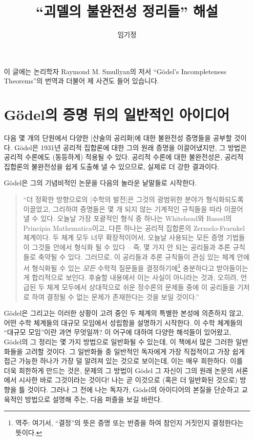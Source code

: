 \documentclass[12pt]{paper}
\title{``괴델의 불완전성 정리들'' 해설}
\author{임기정}
\begin{document}
  \maketitle

  이 글에는 논리학자 Raymond M. Smullyan의 저서 ``G\"odel's Incompleteness Theorems''의 번역과 더불어 제 사견도 들어 있습니다.

  \newpage

  \section{G\"odel의 증명 뒤의 일반적인 아이디어}
  \hspace{12pt}

  다음 몇 개의 단원에서 다양한 [산술의 공리화]에 대한 불완전성 증명들을 공부할 것이다.
  G\"odel은 1931년 공리적 집합론에 대한 그의 원래 증명을 이끌어냈지만,
  그 방법은 공리적 수론에도 (동등하게) 적용될 수 있다.
  공리적 수론에 대한 불완전성은,
  공리적 집합론의 불완전성을 쉽게 도출해 낼 수 있으므로,
  실제로 더 강한 결과이다.
  
  G\"odel은 그의 기념비적인 논문을 다음의 놀라운 낱말들로 시작한다.

  \begin{quotation}
    ``더 정확한 방향으로의 [수학의 발전]은 그것의 광범위한 분야가 형식화되도록 이끌었고,
    그리하여 증명들은 몇 개 되지 않는 기계적인 규칙들을 따라 이끌어 낼 수 있다.
    오늘날 가장 포괄적인 형식 중 하나는 Whitehead와 Russel의 Principia Mathematica이고,
    다른 하나는 공리적 집합론의 Zermelo-Fraenkel 체계이다.
    두 체계 모두 너무 확장적이어서,
    오늘날 사용되는 모든 증명 기법들이 그것들 안에서 형식화 될 수 있다 --
    즉, 몇 가지 안 되는 공리들과 추론 규칙들로 축약될 수 있다.
    그러므로, 이 공리들과 추론 규칙들이 관심 있는 체계 안에서 형식화될 수 있는 \textit{모든} 수학적 질문들을 결정하기에\footnote
    {
      역주: 여기서, ``결정''의 뜻은 증명 또는 반증을 하여 참인지 거짓인지 결정한다는 뜻이다.
    }
    충분하다고 받아들이는 게 합리적으로 보인다.
    후술할 내용에서 이는 사실이 아니라는 것과,
    오히려, 언급된 두 체계 모두에서 상대적으로 쉬운 정수론의 문제들 중에 이 공리들을 기저로 하여 결정될 수 없는 문제가 존재한다는 것을 보일 것이다.''
  \end{quotation}

  G\"odel은 그리고는 이러한 상황이 고려 중인 두 체계의 특별한 본성에 의존하지 않고,
  어떤 수학 체계들의 대규모 모임에서 성립함을 설명하기 시작한다.
  이 수학 체계들의 ``대규모 모임''이란 과연 무엇일까?
  이 어구에 대하여 다양한 해석들이 있어왔고,
  G\"odel의 그 정리는 몇 가지 방법으로 일반화될 수 있는데,
  이 책에서 많은 그러한 일반화들을 고려할 것이다.
  그 일반화들 중 일반적인 독자에게 가장 직접적이고 가장 쉽게 접근 가능한 하나가 가장 덜 알려져 있는 것으로 보이는데,
  이는 매우 희한하다.
  이를 더욱 희한하게 만드는 것은,
  문제의 그 방법이 G\"odel 그 자신이 그의 원래 논문의 서론에서 시사한 바로 그것이라는 것이다!
  나는 곧 이것으로 (혹은 더 일반화된 것으로) 방향을 틀 것이다.
  그러나 그 전에 나는 독자가,
  G\"odel의 아이디어의 본질을 단순하고 교육적인 방법으로 설명해 주는,
  다음 퍼즐을 보길 바란다.
\end{document}
